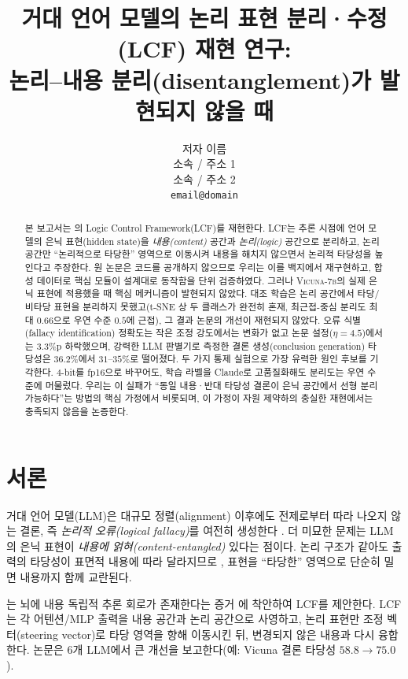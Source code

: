 \documentclass[11pt]{article}
\title{거대 언어 모델의 논리 표현 분리·수정(LCF) 재현 연구:\\
논리--내용 분리(disentanglement)가 발현되지 않을 때}
\author{저자 이름 \\
  소속 / 주소 1 \\
  소속 / 주소 2 \\
  \texttt{email@domain} \\}
\begin{document}
\maketitle

\begin{abstract}
본 보고서는 \citet{wu2025lcf}의 Logic Control Framework(LCF)를 재현한다. LCF는
추론 시점에 언어 모델의 은닉 표현(hidden state)을 \emph{내용(content)} 공간과
\emph{논리(logic)} 공간으로 분리하고, 논리 공간만 ``논리적으로 타당한'' 영역으로
이동시켜 내용을 해치지 않으면서 논리적 타당성을 높인다고 주장한다. 원 논문은 코드를
공개하지 않으므로 우리는 이를 백지에서 재구현하고, 합성 데이터로 핵심 모듈이 설계대로
동작함을 단위 검증하였다. 그러나 \textsc{Vicuna-7b}의 실제 은닉 표현에 적용했을 때
핵심 메커니즘이 발현되지 않았다. 대조 학습은 논리 공간에서 타당/비타당 표현을 분리하지
못했고(t-SNE 상 두 클래스가 완전히 혼재, 최근접-중심 분리도 최대 $0.66$으로 우연 수준
$0.5$에 근접), 그 결과 논문의 개선이 재현되지 않았다. 오류 식별(fallacy
identification) 정확도는 작은 조정 강도에서는 변화가 없고 논문 설정($\eta{=}4.5$)에서는
$3.3$\%p 하락했으며, 강력한 LLM 판별기로 측정한 결론 생성(conclusion generation)
타당성은 $36.2\%$에서 $31\text{--}35\%$로 떨어졌다. 두 가지 통제 실험으로 가장 유력한
원인 후보를 기각한다. 4-bit를 fp16으로 바꾸어도, 학습 라벨을 Claude로 고품질화해도
분리도는 우연 수준에 머물렀다. 우리는 이 실패가 ``동일 내용·반대 타당성 결론이 은닉
공간에서 선형 분리 가능하다''는 방법의 핵심 가정에서 비롯되며, 이 가정이 자원 제약하의
충실한 재현에서는 충족되지 않음을 논증한다.
\end{abstract}

\section{서론}
거대 언어 모델(LLM)은 대규모 정렬(alignment) 이후에도 전제로부터 따라 나오지 않는
결론, 즉 \emph{논리적 오류(logical fallacy)}를 여전히 생성한다 \citep{wu2025lcf}. 더
미묘한 문제는 LLM의 은닉 표현이 \emph{내용에 얽혀(content-entangled)} 있다는 점이다.
논리 구조가 같아도 출력의 타당성이 표면적 내용에 따라 달라지므로
\citep{dasgupta2024content}, 표현을 ``타당한'' 영역으로 단순히 밀면 내용까지 함께
교란된다.

\citet{wu2025lcf}는 뇌에 내용 독립적 추론 회로가 존재한다는 증거
\citep{monti2012logic}에 착안하여 LCF를 제안한다. LCF는 각 어텐션/MLP 출력을 내용
공간과 논리 공간으로 사영하고, 논리 표현만 조정 벡터(steering vector)로 타당 영역을 향해
이동시킨 뒤, 변경되지 않은 내용과 다시 융합한다. 논문은 6개 LLM에서 큰 개선을
보고한다(예: Vicuna 결론 타당성 $58.8\!\to\!75.0$).
\end{document}
